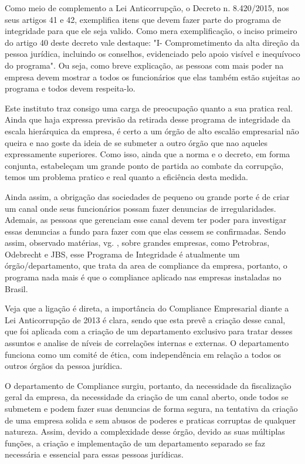 Como meio de complemento a Lei Anticorrupção, o Decreto n. 8.420/2015, nos seus artigos 41 e 42, exemplifica itens que devem fazer parte do programa de integridade para que ele seja valido. Como mera exemplificação, o inciso primeiro do artigo 40 deste decreto vale destaque: "I- Comprometimento da alta direção da pessoa jurídica, incluindo os conselhos, evidenciado pelo apoio visível e inequívoco do programa". Ou seja, como breve explicação, as pessoas com mais poder na empresa devem mostrar a todos os funcionários que elas também estão sujeitas ao programa e todos devem respeita-lo. 

Este instituto traz consigo uma carga de preocupação quanto a sua pratica real. Ainda que haja expressa previsão da retirada desse programa de integridade da escala hierárquica da empresa, é certo a um órgão de alto escalão empresarial não queira e nao goste da ideia de se submeter a outro órgão que nao aqueles expressamente superiores. Como isso, ainda que a norma e o decreto, em forma conjunta, estabeleçam um grande ponto de partida ao combate da corrupção, temos um problema pratico e real quanto a eficiência desta medida. 

Ainda assim, a obrigação das sociedades de pequeno ou grande porte é de criar um canal onde seus funcionários possam fazer denuncias de irregularidades. Ademais, as pessoas que gerenciam esse canal devem ter poder para investigar essas denuncias a fundo para fazer com que elas cessem se confirmadas. Sendo assim, observado matérias, vg. \cite{Gazetaonline}, sobre grandes empresas, como Petrobras, Odebrecht e JBS, esse Programa de Integridade é atualmente um órgão/departamento, que trata da area de compliance da empresa, portanto, o programa nada mais é que o compliance aplicado nas empresas instaladas no Brasil. 

Veja que a ligação é direta, a importância do Compliance Empresarial diante a Lei Anticorrupção de 2013 é clara, sendo que esta prevê a criação desse canal, que foi aplicada com a criação de um departamento exclusivo para tratar desses assuntos e analise de níveis de correlações internas e externas. O departamento funciona como um comité de ética, com independência em relação a todos os outros órgãos da pessoa jurídica. 

O departamento de Compliance surgiu, portanto, da necessidade da fiscalização geral da empresa, da necessidade da criação de um canal aberto, onde todos se submetem e podem fazer suas denuncias de forma segura, na tentativa da criação de uma empresa solida e sem abusos de poderes e praticas corruptas de qualquer natureza. Assim, devido a complexidade desse órgão, devido as suas múltiplas funções, a criação e implementação de um departamento separado se faz necessária e essencial para essas pessoas jurídicas. 


